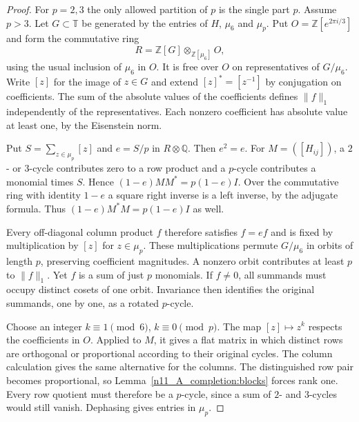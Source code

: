 \documentclass[11pt,a4paper]{article}
\numberwithin{equation}{section}
\begin{document}
\begin{proof}
For $p=2,3$ the only allowed partition of $p$ is the single part $p$. Assume $p>3$. Let $G\subset\mathbb T$ be generated by the entries of $H$, $\mu_6$ and $\mu_p$. Put $O=\mathbb Z[e^{2\pi i/3}]$ and form the commutative ring
$$R=\mathbb Z[G]\otimes_{\mathbb Z[\mu_6]}O,$$
using the usual inclusion of $\mu_6$ in $O$. It is free over $O$ on representatives of $G/\mu_6$. Write $[z]$ for the image of $z\in G$ and extend $[z]^*=[z^{-1}]$ by conjugation on coefficients. The sum of the absolute values of the coefficients defines $\|f\|_1$ independently of the representatives. Each nonzero coefficient has absolute value at least one, by the Eisenstein norm.

Put $S=\sum_{z\in\mu_p}[z]$ and $e=S/p$ in $R\otimes\mathbb Q$. Then $e^2=e$. For $M=([H_{ij}])$, a $2$- or $3$-cycle contributes zero to a row product and a $p$-cycle contributes a monomial times $S$. Hence $(1-e)MM^*=p(1-e)I$. Over the commutative ring with identity $1-e$ a square right inverse is a left inverse, by the adjugate formula. Thus $(1-e)M^*M=p(1-e)I$ as well.

Every off-diagonal column product $f$ therefore satisfies $f=ef$ and is fixed by multiplication by $[z]$ for $z\in\mu_p$. These multiplications permute $G/\mu_6$ in orbits of length $p$, preserving coefficient magnitudes. A nonzero orbit contributes at least $p$ to $\|f\|_1$. Yet $f$ is a sum of just $p$ monomials. If $f\ne0$, all summands must occupy distinct cosets of one orbit. Invariance then identifies the original summands, one by one, as a rotated $p$-cycle.

Choose an integer $k\equiv1\pmod6$, $k\equiv0\pmod p$. The map $[z]\mapsto z^k$ respects the coefficients in $O$. Applied to $M$, it gives a flat matrix in which distinct rows are orthogonal or proportional according to their original cycles. The column calculation gives the same alternative for the columns. The distinguished row pair becomes proportional, so Lemma~\ref{n11_A_completion:blocks} forces rank one. Every row quotient must therefore be a $p$-cycle, since a sum of $2$- and $3$-cycles would still vanish. Dephasing gives entries in $\mu_p$.
\end{proof}
\end{document}
